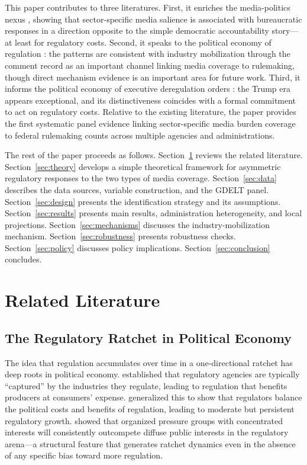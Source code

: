 \documentclass[12pt]{article}
\begin{document}
This paper contributes to three literatures. First, it enriches the media-politics nexus \citep{gentzkow2015media, stromberg2004mass}, showing that sector-specific media salience is associated with bureaucratic responses in a direction opposite to the simple democratic accountability story---at least for regulatory costs. Second, it speaks to the political economy of regulation \citep{stigler1971theory, peltzman1976toward, becker1983theory}: the patterns are consistent with industry mobilization through the comment record as an important channel linking media coverage to rulemaking, though direct mechanism evidence is an important area for future work. Third, it informs the political economy of executive deregulation orders \citep{rai2020deregulation, sunstein2014simpler}: the Trump era appears exceptional, and its distinctiveness coincides with a formal commitment to act on regulatory costs. Relative to the existing literature, the paper provides the first systematic panel evidence linking sector-specific media burden coverage to federal rulemaking counts across multiple agencies and administrations.

The rest of the paper proceeds as follows. Section~\ref{sec:lit} reviews the related literature. Section~\ref{sec:theory} develops a simple theoretical framework for asymmetric regulatory responses to the two types of media coverage. Section~\ref{sec:data} describes the data sources, variable construction, and the GDELT panel. Section~\ref{sec:design} presents the identification strategy and its assumptions. Section~\ref{sec:results} presents main results, administration heterogeneity, and local projections. Section~\ref{sec:mechanisms} discusses the industry-mobilization mechanism. Section~\ref{sec:robustness} presents robustness checks. Section~\ref{sec:policy} discusses policy implications. Section~\ref{sec:conclusion} concludes.

\section{Related Literature}
\label{sec:lit}

\subsection{The Regulatory Ratchet in Political Economy}

The idea that regulation accumulates over time in a one-directional ratchet has deep roots in political economy. \citet{stigler1971theory} established that regulatory agencies are typically ``captured'' by the industries they regulate, leading to regulation that benefits producers at consumers' expense. \citet{peltzman1976toward} generalized this to show that regulators balance the political costs and benefits of regulation, leading to moderate but persistent regulatory growth. \citet{becker1983theory} showed that organized pressure groups with concentrated interests will consistently outcompete diffuse public interests in the regulatory arena---a structural feature that generates ratchet dynamics even in the absence of any specific bias toward more regulation.
\end{document}
